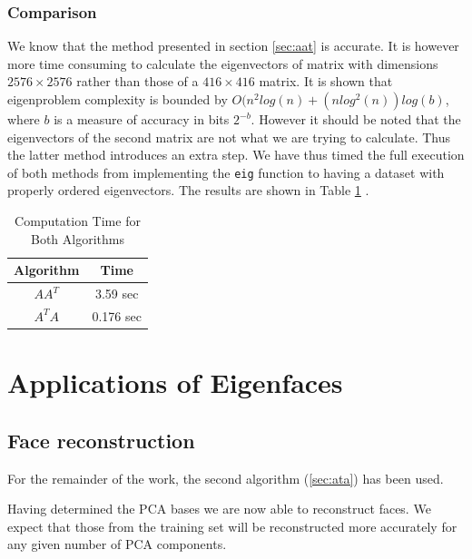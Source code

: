 \documentclass[10pt,twocolumn,letterpaper]{article}
\begin{document}
\subsubsection{Comparison}

We know that the method presented in section \ref{sec:aat} is accurate. It is however more time consuming to calculate the eigenvectors of matrix with dimensions $2576 \times 2576$ rather than those of a $416 \times 416$ matrix. It is shown \cite{Complex} that eigenproblem complexity is bounded by $O(n^2log(n)+(nlog^2(n))log(b)$, where $b$ is a measure of accuracy in bits $2^{-b}$. However it should be noted that the eigenvectors of the second matrix are not what we are trying to calculate. Thus the latter method introduces an extra step. We have thus timed the full execution of both methods from implementing the {\tt\small eig} function to having a dataset with properly ordered eigenvectors. The results are shown in Table \ref{tab:times1} .

\begin{table}[H]
\begin{center}
\begin{tabular}{||c c||}
\hline
\bf Algorithm & \bf Time\\ [0.5ex]
\hline
 $AA^T$ & 3.59 sec\\ [0.5ex]
\hline
 $A^TA$ & 0.176 sec \\ [0.5ex]
\hline
\end{tabular}
\end{center}
\caption{Computation Time for Both Algorithms} \label{tab:times1}
\end{table}

\section{Applications of Eigenfaces}
\subsection{Face reconstruction}

For the remainder of the work, the second algorithm (\ref{sec:ata}) has been used.

Having determined the PCA bases we are now able to reconstruct faces. We expect that those from the training set will be reconstructed more accurately for any given number of PCA components.
\end{document}
